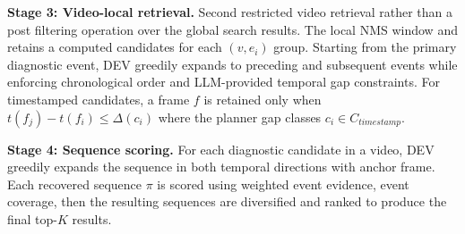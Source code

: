\documentclass[runningheads]{llncs}
\begin{document}
\textbf{Stage 3: Video-local retrieval.} Second restricted video retrieval rather than a post filtering operation
over the global search results.
The local NMS window and retains a computed candidates for each $(v,e_i)$ group. Starting from the primary diagnostic event, DEV greedily expands to preceding and subsequent events while enforcing chronological order and LLM-provided temporal gap constraints. For timestamped candidates, a frame $f$ is retained only when
$t(f_j)-t(f_i)\leq\Delta(c_i)$ where the planner gap classes $c_i\in C_{timestamp}$.

\textbf{Stage 4: Sequence scoring.} For each diagnostic candidate in a video, DEV greedily expands the sequence
in both temporal directions with anchor frame. Each recovered sequence $\pi$ is scored using weighted event evidence, event coverage, then the resulting sequences are diversified and ranked to produce the final top-$K$ results.


\end{document}
